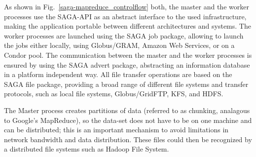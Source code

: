 \documentclass[conference,final]{IEEEtran}
\newcommand{\michaelnote}[1]{ {\textcolor{blue} { ***MM: #1 }}}
\newcommand{\michaelnote}[1]{ {\textcolor{blue} { ***MM: #1 }}}
\begin{document}
As shown in Fig.~\ref{saga-mapreduce_controlflow} both, the master and
the worker processes use the SAGA-API as an abstract interface to the
used infrastructure, making the application portable between different
architectures and systems. The worker processes are launched using the
SAGA job package, allowing to launch the jobs either locally, using
Globus/GRAM, Amazon Web Services, or on a Condor pool. The
communication between the master and the worker processes is ensured
by using the SAGA advert package, abstracting an information database
in a platform independent way. All file transfer operations are based
on the SAGA file package, providing a broad range of different file
systems and transfer protocols, such as local file systems,
Globus/GridFTP, KFS, and HDFS.

The Master process creates partitions of data (referred to as chunking, analagous to Google's MapReduce), so the data-set does not have to be
on one machine and can be distributed; this is an important
mechanism to avoid limitations in network bandwidth and data distribution.
These files could then be recognized by a distributed file systems
such as Hadoop File System.



\end{document}

